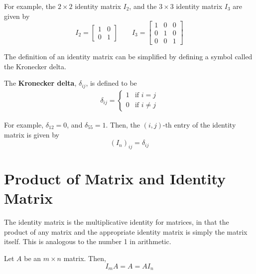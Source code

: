 \documentclass[letterpaper,12pt]{article}
\begin{document}
For example, the $2 \times 2$ identity matrix $I_2$, and the $3 \times 3$ identity matrix $I_3$ are given by
\begin{equation*}
    I_2 = \begin{bmatrix} 1 & 0 \\ 0 & 1 \end{bmatrix} \qquad I_3 = \begin{bmatrix} 1 & 0 & 0 \\ 0 & 1 & 0 \\ 0 & 0 & 1 \end{bmatrix}
\end{equation*}

The definition of an identity matrix can be simplified by defining a symbol called the Kronecker delta. 

\begin{definition}
The \textbf{Kronecker delta}, $\delta_{ij}$, is defined to be
\begin{align*}
    \delta_{ij} = \begin{cases} 1 & \text{if $i = j$} \\ 0 & \text{if $i \neq j$} \end{cases}
\end{align*}
\end{definition}

For example, $\delta_{12} = 0$, and $\delta_{55} = 1$. Then, the $(i,j)$-th entry of the identity matrix is given by
\begin{equation*}
    (I_n)_{ij} = \delta_{ij}
\end{equation*}

\section*{Product of Matrix and Identity Matrix}
The identity matrix is the multiplicative identity for matrices, in that the product of any matrix and the appropriate identity matrix is simply the matrix itself. This is analogous to the number 1 in arithmetic.

\begin{theorem}
Let $A$ be an $m \times n$ matrix. Then,
\begin{equation*}
    I_m A = A = AI_n
\end{equation*}
\end{theorem}
\end{document}
